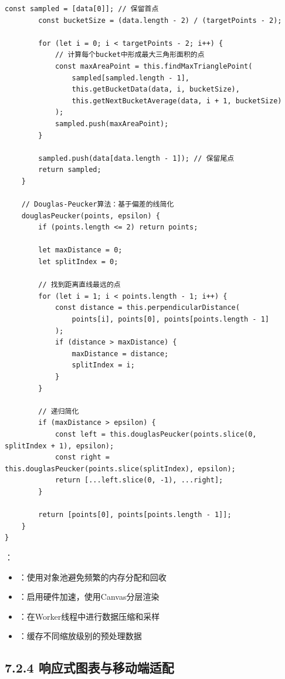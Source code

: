 \begin{lstlisting}[style=javascript]
        const sampled = [data[0]]; // 保留首点
        const bucketSize = (data.length - 2) / (targetPoints - 2);
        
        for (let i = 0; i < targetPoints - 2; i++) {
            // 计算每个bucket中形成最大三角形面积的点
            const maxAreaPoint = this.findMaxTrianglePoint(
                sampled[sampled.length - 1],
                this.getBucketData(data, i, bucketSize),
                this.getNextBucketAverage(data, i + 1, bucketSize)
            );
            sampled.push(maxAreaPoint);
        }
        
        sampled.push(data[data.length - 1]); // 保留尾点
        return sampled;
    }
    
    // Douglas-Peucker算法：基于偏差的线简化
    douglasPeucker(points, epsilon) {
        if (points.length <= 2) return points;
        
        let maxDistance = 0;
        let splitIndex = 0;
        
        // 找到距离直线最远的点
        for (let i = 1; i < points.length - 1; i++) {
            const distance = this.perpendicularDistance(
                points[i], points[0], points[points.length - 1]
            );
            if (distance > maxDistance) {
                maxDistance = distance;
                splitIndex = i;
            }
        }
        
        // 递归简化
        if (maxDistance > epsilon) {
            const left = this.douglasPeucker(points.slice(0, splitIndex + 1), epsilon);
            const right = this.douglasPeucker(points.slice(splitIndex), epsilon);
            return [...left.slice(0, -1), ...right];
        }
        
        return [points[0], points[points.length - 1]];
    }
}
\end{lstlisting}

：

\begin{itemize}
\tightlist
\item
  ：使用对象池避免频繁的内存分配和回收
\item
  ：启用硬件加速，使用Canvas分层渲染
\item
  ：在Worker线程中进行数据压缩和采样
\item
  ：缓存不同缩放级别的预处理数据
\end{itemize}

\hypertarget{ux54cdux5e94ux5f0fux56feux8868ux4e0eux79fbux52a8ux7aefux9002ux914d}{%
\subsection{7.2.4 响应式图表与移动端适配}\label{ux54cdux5e94ux5f0fux56feux8868ux4e0eux79fbux52a8ux7aefux9002ux914d}}

